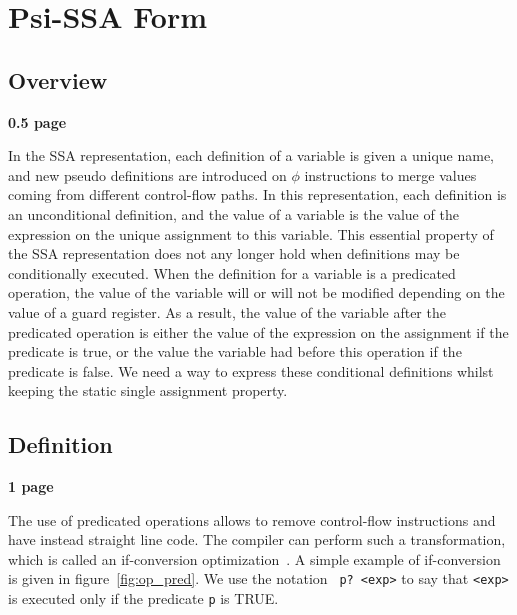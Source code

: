 \chapter{Psi-SSA Form }


\section{Overview}

\textbf{0.5 page}



In the SSA representation, each definition of a variable is given a
unique name, and new pseudo definitions are introduced on $\phi$
instructions to merge values coming from different control-flow
paths. In this representation, each definition is an unconditional
definition, and the value of a variable is the value of the expression
on the unique assignment to this variable. This essential property of
the SSA representation does not any longer hold when definitions may
be conditionally executed. When the definition for a variable is a
predicated operation, the value of the variable will or will not be
modified depending on the value of a guard register. As a result, the
value of the variable after the predicated operation is either the
value of the expression on the assignment if the predicate is true, or
the value the variable had before this operation if the predicate is
false. We need a way to express these conditional definitions whilst
keeping the static single assignment property.

\section{Definition}

\textbf{1 page}


The use of predicated operations allows to remove control-flow
instructions and have instead straight line code. The compiler can
perform such a transformation, which is called an if-conversion
optimization~\cite{Fang96, Bru06}. A simple example of if-conversion
is given in figure~\ref{fig:op_pred}. We use the notation {\tt
  p?~<exp>} to say that {\tt <exp>} is executed only if the predicate
{\tt p} is TRUE.

